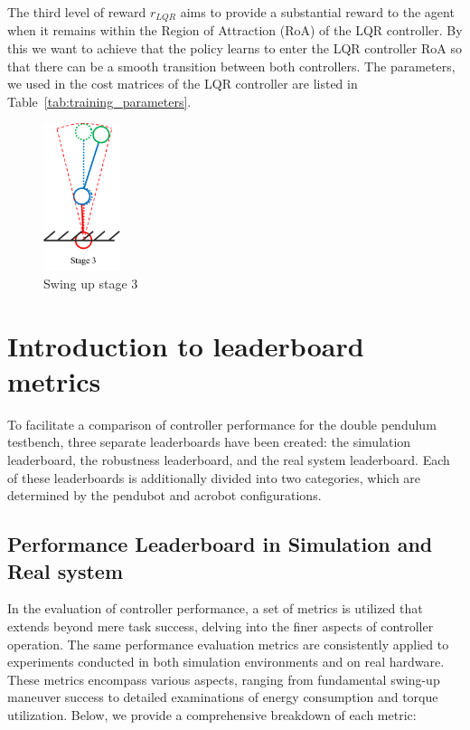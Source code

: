 The third level of reward $r_{LQR}$ aims to provide a substantial reward to the
agent when it remains within the Region of Attraction (RoA) of the LQR
controller. By this we want to achieve that the policy learns to enter the LQR
controller RoA so that there can be a smooth transition between both
controllers.  The parameters, we used in
the cost matrices of the LQR controller are listed in
Table~\ref{tab:training_parameters}. 

\begin{figure}[H]
    \centering
    \includegraphics[width=0.2\textwidth]{figures/methodology/stage3.png} %
    \caption{Swing up stage 3}
    \label{fig:stage3} %
\end{figure}


\section{Introduction to leaderboard metrics}
To facilitate a comparison of controller performance for the double pendulum testbench, three separate leaderboards have been created: the simulation leaderboard, the robustness leaderboard, and the real system leaderboard\cite{2023_ram_wiebe_double_pendulum}. Each of these leaderboards is additionally divided into two categories, which are determined by the pendubot and acrobot configurations.

\subsection{Performance Leaderboard in Simulation and Real system}
In the evaluation of controller performance, a set of metrics is utilized that extends beyond mere task success, delving into the finer aspects of controller operation. The same performance evaluation metrics are consistently applied to experiments conducted in both simulation environments and on real hardware. These metrics encompass various aspects, ranging from fundamental swing-up maneuver success to detailed examinations of energy consumption and torque utilization. Below, we provide a comprehensive breakdown of each metric:

